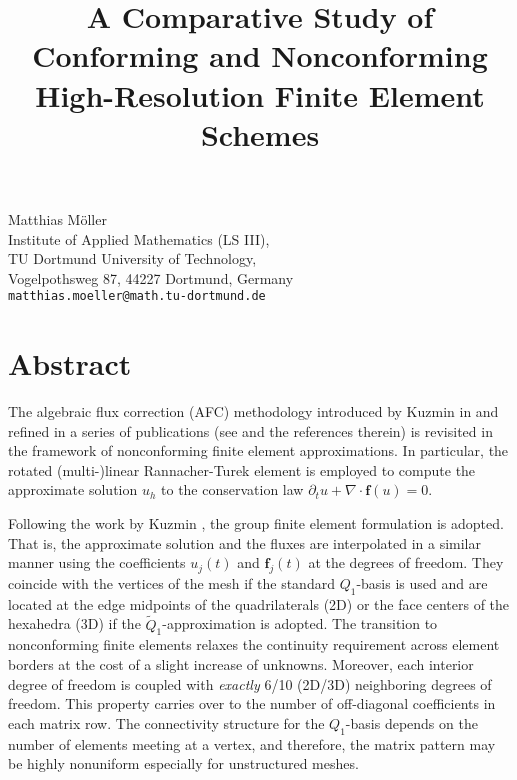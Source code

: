 \title{A Comparative Study of Conforming and Nonconforming High-Resolution Finite Element Schemes}
 \author{} \institute{}
\maketitle
\begin{center}
{\large Matthias M\"oller}\\
Institute of Applied Mathematics (LS III),\\ TU Dortmund University of Technology,\\ Vogelpothsweg 87, 44227 Dortmund, Germany\\
{\tt matthias.moeller@math.tu-dortmund.de}

\end{center}

\section*{Abstract}

The algebraic flux correction (AFC) methodology introduced by Kuzmin in \cite{Kuzmin2001,Kuzmin2002} and refined in a series of publications (see \cite{Kuzmin2012} and the references therein) is revisited in the framework of nonconforming finite element approximations. In particular, the rotated (multi-)linear Rannacher-Turek element \cite{RannacherTurek1992} is employed to compute the approximate solution $u_h$ to the conservation law $\partial_tu+\nabla\cdot\mathbf{f}(u)=0$.

Following the work by Kuzmin \cite{Kuzmin2002}, the group finite element formulation \cite{Fletcher1983} is adopted. That is, the approximate solution and the fluxes are interpolated in a similar manner using the coefficients $u_j(t)$ and $\mathbf{f}_j(t)$ at the degrees of freedom. They coincide with the vertices of the mesh if the standard $Q_1$-basis is used and are located at the edge midpoints of the quadrilaterals (2D) or the face centers of the hexahedra (3D) if the $\tilde Q_1$-approximation is adopted. The transition to nonconforming finite elements relaxes the continuity requirement across element borders at the cost of a slight increase of unknowns. Moreover, each interior degree of freedom  is coupled with \textit{exactly} 6/10 (2D/3D) neighboring degrees of freedom. This property carries over to the number of off-diagonal coefficients in each matrix row. The connectivity structure for the $Q_1$-basis depends on the number of elements meeting at a vertex, and therefore, the matrix pattern may be highly nonuniform especially for unstructured meshes.

